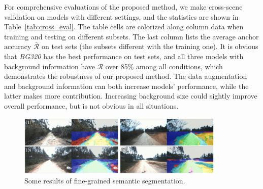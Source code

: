 \documentclass[letterpaper, 10 pt, conference]{ieeeconf}  %
\begin{document}
	For comprehensive evaluations of the proposed method, we make cross-scene validation on models with different settings, and the statistics are shown in Table~\ref{tab:cross_eval}. The table cells are colorized along column data when training and testing on different subsets. The last column lists the average anchor accuracy $\bar{\mathcal{R}}$ on test sets (the subsets different with the training one). It is obvious that \textit{BG320} has the best performance on test sets, and all three models with background information have $\mathcal{R}$ over 85\% among all conditions, which demonstrates the robustness of our proposed method.
	The data augmentation and background information can both increase models' performance, while the latter makes more contribution. Increasing background size could sightly improve overall performance, but is not obvious in all situations.
	
	\begin{figure}[]
		\centering
		\includegraphics[width=0.88\textwidth]{semantic_segmentation.pdf}
		\caption{Some results of fine-grained semantic segmentation.}
		\label{fig:semantic_segmentation}
	\end{figure}
	
\end{document}
